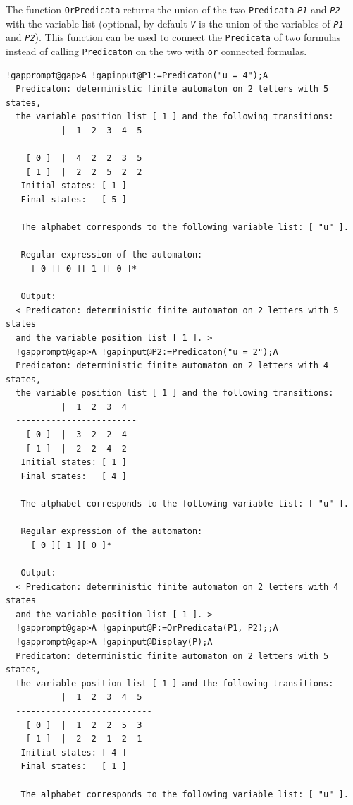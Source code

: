 \documentclass[a4paper,11pt]{report}
\begin{document}
{{{ The function \texttt{OrPredicata} returns the union of the two \texttt{Predicata} \mbox{\texttt{\mdseries\slshape P1}} and \mbox{\texttt{\mdseries\slshape P2}} with the variable list (optional, by default \mbox{\texttt{\mdseries\slshape V}} is the union of the variables of \mbox{\texttt{\mdseries\slshape P1}} and \mbox{\texttt{\mdseries\slshape P2}}). This function can be used to connect the \texttt{Predicata} of two formulas instead of calling \texttt{Predicaton} on the two with \texttt{or} connected formulas. 
\begin{Verbatim}[commandchars=!@A,fontsize=\small,frame=single,label=Example]
  !gapprompt@gap>A !gapinput@P1:=Predicaton("u = 4");A
  Predicaton: deterministic finite automaton on 2 letters with 5 states, 
  the variable position list [ 1 ] and the following transitions:
           |  1  2  3  4  5  
  ---------------------------
    [ 0 ]  |  4  2  2  3  5  
    [ 1 ]  |  2  2  5  2  2  
   Initial states: [ 1 ]
   Final states:   [ 5 ]
  
   The alphabet corresponds to the following variable list: [ "u" ].
  
   Regular expression of the automaton:
     [ 0 ][ 0 ][ 1 ][ 0 ]*
  
   Output:
  < Predicaton: deterministic finite automaton on 2 letters with 5 states 
  and the variable position list [ 1 ]. >
  !gapprompt@gap>A !gapinput@P2:=Predicaton("u = 2");A
  Predicaton: deterministic finite automaton on 2 letters with 4 states, 
  the variable position list [ 1 ] and the following transitions:
           |  1  2  3  4  
  ------------------------
    [ 0 ]  |  3  2  2  4  
    [ 1 ]  |  2  2  4  2  
   Initial states: [ 1 ]
   Final states:   [ 4 ]
  
   The alphabet corresponds to the following variable list: [ "u" ].
  
   Regular expression of the automaton:
     [ 0 ][ 1 ][ 0 ]*
  
   Output:
  < Predicaton: deterministic finite automaton on 2 letters with 4 states 
  and the variable position list [ 1 ]. >
  !gapprompt@gap>A !gapinput@P:=OrPredicata(P1, P2);;A
  !gapprompt@gap>A !gapinput@Display(P);A
  Predicaton: deterministic finite automaton on 2 letters with 5 states, 
  the variable position list [ 1 ] and the following transitions:
           |  1  2  3  4  5  
  ---------------------------
    [ 0 ]  |  1  2  2  5  3  
    [ 1 ]  |  2  2  1  2  1  
   Initial states: [ 4 ]
   Final states:   [ 1 ]
  
   The alphabet corresponds to the following variable list: [ "u" ].
\end{Verbatim}
 }

}}
\end{document}
